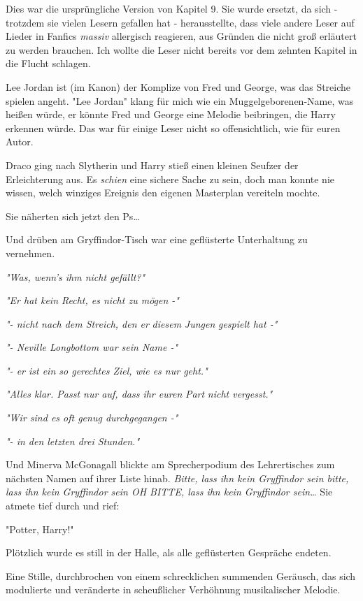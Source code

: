 {Dies war die ursprüngliche Version von Kapitel 9. Sie wurde ersetzt, da sich - trotzdem sie vielen Lesern gefallen hat - herausstellte, dass viele andere Leser auf Lieder in Fanfics \emph{massiv} allergisch reagieren, aus Gründen die nicht groß erläutert zu werden brauchen. Ich wollte die Leser nicht bereits vor dem zehnten Kapitel in die Flucht schlagen.

Lee Jordan ist (im Kanon) der Komplize von Fred und George, was das Streiche spielen angeht. "Lee Jordan" klang für mich wie ein Muggelgeborenen-Name, was heißen würde, er könnte Fred und George eine Melodie beibringen, die Harry erkennen würde. Das war für einige Leser nicht so offensichtlich, wie für euren Autor.

\later

Draco ging nach Slytherin und Harry stieß einen kleinen Seufzer der Erleichterung aus. Es \emph{schien} eine sichere Sache zu sein, doch man konnte nie wissen, welch winziges Ereignis den eigenen Masterplan vereiteln mochte.

Sie näherten sich jetzt den Ps…

Und drüben am Gryffindor-Tisch war eine geflüsterte Unterhaltung zu vernehmen.

\emph{"Was, wenn's ihm nicht gefällt?"}

\emph{"Er hat kein Recht, es nicht zu mögen -"}

\emph{"- nicht nach dem Streich, den er} \emph{diesem} \emph{Jungen} \emph{gespielt hat -"}

\emph{"- Neville Longbottom war sein Name -"}

\emph{"- er ist ein so gerechtes Ziel, wie es nur geht."}

\emph{"Alles klar. Passt nur auf, dass ihr euren} \emph{Part} \emph{nicht vergesst."}

\emph{"Wir sind es oft genug durchgegangen -"}

\emph{"- in den letzten drei Stunden."}

Und Minerva McGonagall blickte am Sprecherpodium des Lehrertisches zum nächsten Namen auf ihrer Liste hinab. \emph{Bitte, lass ihn kein Gryffindor sein bitte, lass ihn kein Gryffindor sein OH BITTE, lass ihn kein Gryffindor sein…} Sie atmete tief durch und rief:

"Potter, Harry!"

Plötzlich wurde es still in der Halle, als alle geflüsterten Gespräche endeten.

Eine Stille, durchbrochen von einem schrecklichen summenden Geräusch, das sich modulierte und veränderte in scheußlicher Verhöhnung musikalischer Melodie.

}
